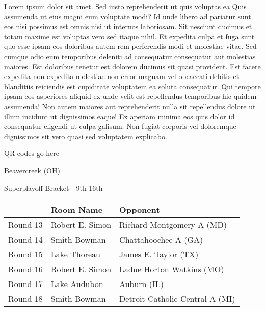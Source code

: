 \documentclass{article}%
\begin{document}
\vspace*{8pt}%
\linebreak%
\newline%
\newline%
Lorem ipsum dolor sit amet. Sed iusto reprehenderit ut quis voluptas ea Quis assumenda ut eius magni eum voluptate modi? Id unde libero ad pariatur sunt eos nisi possimus est omnis nisi ut internos laboriosam. Sit nesciunt ducimus et totam maxime est voluptas vero sed itaque nihil. Et expedita culpa et fuga sunt quo esse ipsam eos doloribus autem rem perferendis modi et molestiae vitae.\newline%
\newline%
Sed cumque odio eum temporibus deleniti ad consequatur consequatur aut molestias maiores. Est doloribus tenetur est dolorem ducimus sit quasi provident. Est facere expedita non expedita molestiae non error magnam vel obcaecati debitis et blanditiis reiciendis est cupiditate voluptatem ea soluta consequatur. Qui tempore ipsam eos asperiores aliquid ex unde velit est repellendus temporibus hic quidem assumenda!\newline%
\newline%
Non autem maiores aut reprehenderit nulla sit repellendus dolore ut illum incidunt ut dignissimos eaque! Ex aperiam minima eos quis dolor id consequatur eligendi ut culpa galisum. Non fugiat corporis vel doloremque dignissimos sit vero quasi sed voluptatem explicabo.\newline%
\newline%
%
\vspace*{30pt}%
\begin{center}%
\begin{Huge}%
QR codes go here%
\end{Huge}%
\end{center}%
\newpage%
\begin{center}%
\begin{Huge}%
Beavercreek (OH)%
\end{Huge}%
\vspace*{8pt}%
\linebreak%
\begin{Large}%
Superplayoff Bracket {-} 9th{-}16th%
\end{Large}%
\end{center}%
%
\begin{tabularx}{\textwidth}{|c|Y|Y|}%
\hline%
&Room Name&Opponent\\%
\hline%
Round 13&Robert E. Simon&Richard Montgomery A (MD)\\%
Round 14&Smith Bowman&Chattahoochee A (GA)\\%
Round 15&Lake Thoreau&James E. Taylor (TX)\\%
Round 16&Robert E. Simon&Ladue Horton Watkins (MO)\\%
Round 17&Lake Audubon&Auburn (IL)\\%
Round 18&Smith Bowman&Detroit Catholic Central A (MI)\\%
\hline%
\end{tabularx}%
\end{document}

